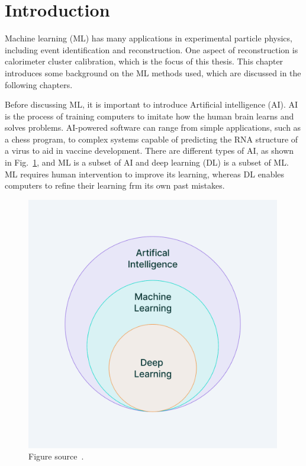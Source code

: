 
\section{Introduction}
Machine learning (ML) has many applications in experimental particle physics, including event identification and reconstruction.
One aspect of reconstruction is calorimeter cluster calibration, which is the focus of this thesis.
This chapter introduces some background on the ML methods used, which are discussed in the following chapters. %

Before discussing ML, it is important to introduce Artificial intelligence (AI).
AI is the process of training computers to imitate how the human brain learns and solves problems.
AI-powered software can range from simple applications, such as a chess program, to complex systems capable of predicting the RNA structure of a virus to aid in vaccine development.
There are different types of AI, as shown in Fig.~\ref{fig:ML_diagram}, and ML is a subset of AI and deep learning (DL) is a subset of ML.
ML requires human intervention to improve its learning, whereas DL enables computers to refine their learning frm its own past mistakes.

\begin{figure}[t!]
\centering
\includegraphics[width=0.99\textwidth]{figures/ML_diagram.png}
\caption[ML and AI]{Figure source~\cite{SMtable}.}
\label{fig:ML_diagram}
\end{figure}

